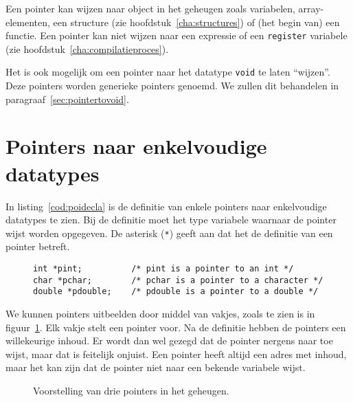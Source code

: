 
Een pointer kan wijzen naar object in het geheugen zoals variabelen, array-elementen, een structure (zie hoofdstuk~\ref{cha:structures}) of (het begin van) een functie. Een pointer kan niet wijzen naar een expressie of een \texttt{register} variabele (zie hoofdstuk~\ref{cha:compilatieproces}).

Het is ook mogelijk om een pointer naar het datatype \texttt{void} te laten ``wijzen''. Deze pointers worden generieke pointers genoemd. We zullen dit behandelen in paragraaf~\ref{sec:pointertovoid}.

\section{Pointers naar enkelvoudige datatypes}
\label{sec:pointersnaarenkelvoudigedatatypes}
In listing~\ref{cod:poidecla} is de definitie van enkele pointers naar enkelvoudige datatypes te zien. Bij de definitie moet het type variabele waarnaar de pointer wijst worden opgegeven. De asterisk (\texttt{*}) geeft aan dat het de definitie van een pointer betreft.

\begin{figure}[!ht]
\begin{lstlisting}[caption=Enkele definities van pointers.,label=cod:poidecla]
int *pint;          /* pint is a pointer to an int */
char *pchar;        /* pchar is a pointer to a character */
double *pdouble;    /* pdouble is a pointer to a double */
\end{lstlisting}
\end{figure}

We kunnen pointers uitbeelden door middel van vakjes, zoals te zien is in figuur~\ref{fig:poivoorstelling1}. Elk vakje stelt een pointer voor. Na de definitie hebben de pointers een willekeurige inhoud. Er wordt dan wel gezegd dat de pointer nergens naar toe wijst, maar dat is feitelijk onjuist. Een pointer heeft altijd een adres met inhoud, maar het kan zijn dat de pointer niet naar een bekende variabele wijst.

\begin{figure}[!ht]
\centering
{}
\caption{Voorstelling van drie pointers in het geheugen.}
\label{fig:poivoorstelling1}
\end{figure}

